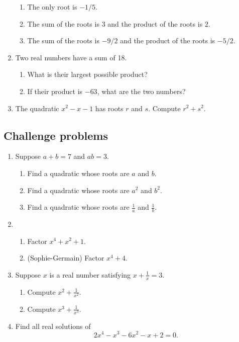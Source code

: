 \begin{enumerate}
\begin{enumerate}
\item The only root is $-1/5$.
\item The sum of the roots is $3$ and the product of the roots is $2$.
\item The sum of the roots is $-9/2$ and the product of the roots is $-5/2$.
\end{enumerate}
\item Two real numbers have a sum of 18.
\begin{enumerate}
\item What is their largest possible product?
\item If their product is $-63$, what are the two numbers?
\end{enumerate}
\item The quadratic $x^2 - x - 1$ has roots $r$ and $s$. Compute $r^2 + s^2$.
\end{enumerate}


\subsection{Challenge problems}

\begin{enumerate}[resume]
\item Suppose $a + b = 7$ and $ab = 3$.
\begin{enumerate}
\item Find a quadratic whose roots are $a$ and $b$.
\item Find a quadratic whose roots are $a^2$ and $b^2$.
\item Find a quadratic whose roots are $\frac{1}{a}$ and $\frac{1}{b}$.
\end{enumerate}
\item \begin{enumerate}
\item Factor $x^4 + x^2 + 1$.
\item (Sophie-Germain) Factor $x^4 + 4$.
\end{enumerate}
\item Suppose $x$ is a real number satisfying $x + \frac{1}{x} = 3$.
\begin{enumerate}
\item Compute $x^2 + \frac{1}{x^2}$.
\item Compute $x^3 + \frac{1}{x^3}$.
\end{enumerate}
\item Find all real solutions of
\begin{equation*}
2x^4 - x^3 - 6x^2 - x + 2 = 0.
\end{equation*}
\end{enumerate}



